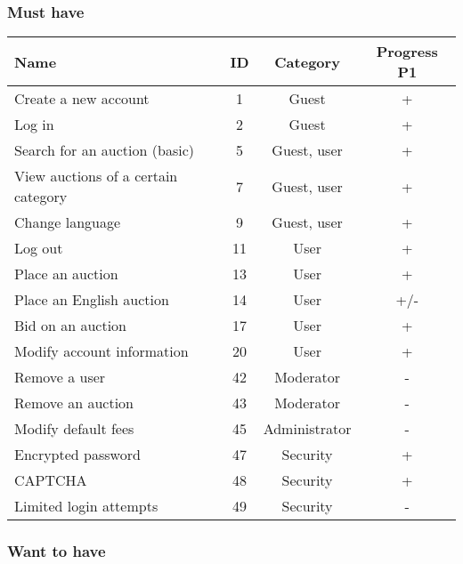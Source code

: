 	\subsubsection{Must have}
	
	\begin{tabular}{l|c c | c}
	  Name & ID & Category & Progress P1 \\ 
	  \hline
	  Create a new account & 1 & Guest & + \\ 
	  Log in & 2 & Guest & + \\	  
	  Search for an auction (basic) & 5 & Guest, user & + \\
	  View auctions of a certain category & 7 & Guest, user & + \\
	  Change language & 9 & Guest, user & + \\
	  Log out & 11 & User & + \\
	  Place an auction & 13 & User & + \\
	  Place an English auction & 14 & User & +/-\\
	  Bid on an auction & 17 & User & +\\
	  Modify account information & 20 & User & +\\
	  Remove a user & 42 & Moderator & -\\
	  Remove an auction & 43 & Moderator & -\\
	  Modify default fees & 45 & Administrator & -\\
	  Encrypted password & 47 & Security & +\\
	  CAPTCHA & 48 & Security & +\\
	  Limited login attempts & 49 & Security & - 	  
	\end{tabular} 
	
	\subsubsection{Want to have}
	
